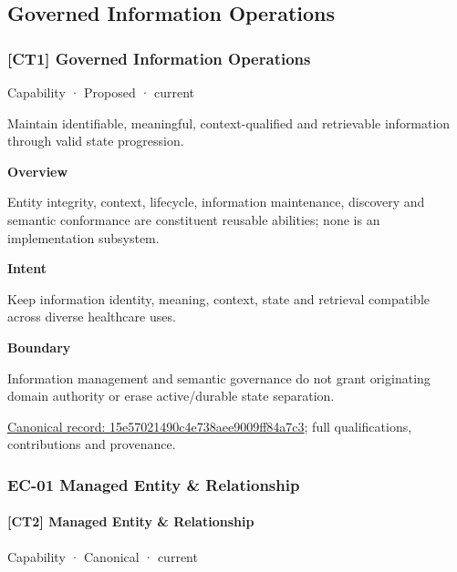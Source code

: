 \subsection{Governed Information Operations}

\subsubsection{[CT1] Governed Information Operations}

\label{element:15e57021490c4e738aee9009ff84a7c3}
{\small Capability · Proposed · current}\par

Maintain identifiable, meaningful, context-qualified and retrievable information through valid state progression.



\textbf{Overview}



Entity integrity, context, lifecycle, information maintenance, discovery and semantic conformance are constituent reusable abilities; none is an implementation subsystem.



\textbf{Intent}



Keep information identity, meaning, context, state and retrieval compatible across diverse healthcare uses.



\textbf{Boundary}



Information management and semantic governance do not grant originating domain authority or erase active/durable state separation.


{\footnotesize \href{../../../../continuum/strategy/capability/15e57021490c4e738aee9009ff84a7c3.md}{Canonical record: 15e57021490c4e738aee9009ff84a7c3}; full qualifications, contributions and provenance.}\par
\subsubsection{EC-01 Managed Entity \& Relationship}

\paragraph{[CT2] Managed Entity \& Relationship}

\label{element:910634fb1621416c818a022ab0b5d3a1}
{\small Capability · Canonical · current}\par

